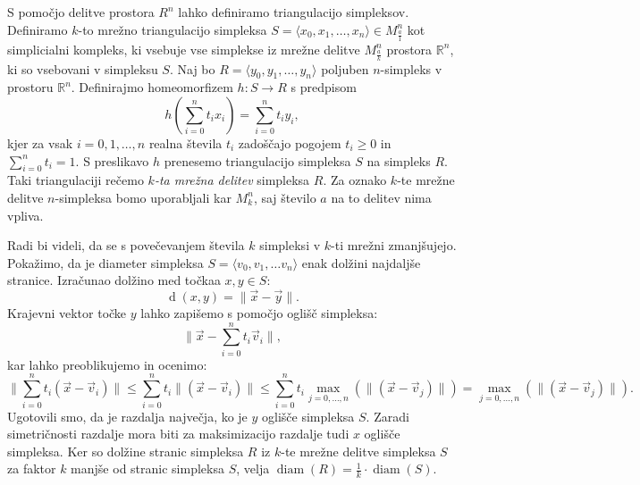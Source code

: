\documentclass[mat1]{fmfdelo}
\newcommand{\R}{\mathbb R}
\DeclareMathOperator{\diam}{diam}
\DeclareMathOperator{\dist}{d}
\newcommand{\0}{0}
\begin{document}
S pomočjo delitve prostora $R^n$ lahko definiramo triangulacijo simpleksov. Definiramo $k$-to mrežno triangulacijo simpleksa $S = \langle x_0, x_1, \dots, x_n \rangle \in M^n_{\frac{a}{1}}$ kot simplicialni kompleks, ki vsebuje vse simplekse iz mrežne delitve $M^n_{\frac{a}{k}}$ prostora $\R^n$, ki so vsebovani v simpleksu $S$.
Naj bo $R = \langle y_0, y_1, \dots, y_n \rangle$ poljuben $n$-simpleks v prostoru $\R^n$. Definirajmo homeomorfizem $h : S \to R$ s predpisom
$$h \left( \sum_{i=0}^n t_i x_i \right) = \sum_{i=0}^n t_i y_i,$$
kjer za vsak $i=0, 1, \dots, n$ realna števila $t_i$ zadoščajo pogojem $t_i \geq 0$ in $\sum_{i=0}^n t_i = 1$.
S preslikavo $h$ prenesemo triangulacijo simpleksa $S$ na simpleks $R$. Taki triangulaciji rečemo \emph{$k$-ta mrežna delitev} simpleksa $R$. Za oznako $k$-te mrežne delitve $n$-simpleksa bomo uporabljali kar $M_k^n$, saj število $a$ na to delitev nima vpliva. 

Radi bi videli, da se s povečevanjem števila $k$ simpleksi v $k$-ti mrežni zmanjšujejo.
Pokažimo, da je diameter simpleksa $S = \langle v_0, v_1, \dots v_n \rangle$ enak dolžini najdaljše stranice. Izračunao dolžino med točkaa $x, y \in S$:
$$\dist(x, y) = \| \vec{x} - \vec{y} \|.$$
Krajevni vektor točke $y$ lahko zapišemo s pomočjo oglišč simpleksa:
$$\| \vec{x} - \sum_{i=0}^n t_i \vec{v}_i \|,$$
kar lahko preoblikujemo in ocenimo:
$$\| \sum_{i=0}^n t_i (\vec{x} - \vec{v}_i)\| \leq \sum_{i=0}^n t_i \| (\vec{x} - \vec{v}_i) \| \leq \sum_{i=0}^n t_i \max_{j=0, \dots, n}(\| (\vec{x} - \vec{v}_j) \|) = \max_{j=0, \dots, n}(\| (\vec{x} - \vec{v}_j) \|).$$
Ugotovili smo, da je razdalja največja, ko je $y$ oglišče simpleksa $S$. Zaradi simetričnosti razdalje mora biti za maksimizacijo razdalje tudi $x$ oglišče simpleksa.
Ker so dolžine stranic simpleksa $R$ iz $k$-te mrežne delitve simpleksa $S$ za faktor $k$ manjše od stranic simpleksa $S$, velja $\diam(R) = \frac{1}{k} \cdot \diam(S)$.
\end{document}

